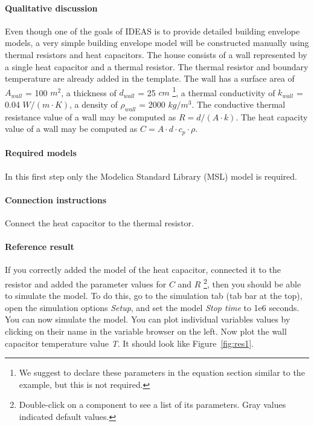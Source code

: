 \documentclass[10pt,a4paper]{article}
\begin{document}
\paragraph{Qualitative discussion}
Even though one of the goals of IDEAS is to provide
detailed building envelope models, a very simple building
envelope model will be constructed manually using thermal
resistors and heat capacitors.
The house consists of a wall represented 
by a single heat capacitor and a thermal resistor. 
The thermal resistor and boundary temperature 
are already added in the template.
The wall has a surface area of $A_{wall}$ = 100 $m^2$, 
a thickness of $d_{wall}$ = 25 $cm$
\footnote{We suggest to declare these parameters in the equation section similar to the example, but this is not required.}, 
a thermal conductivity of $k_{wall}$ = 0.04 $W/(m\cdot K)$, 
a density of $\rho_{wall}$ = 2000 $kg/m^3$.
The conductive thermal resistance value of a wall may be computed as $R=d/(A\cdot k)$.
The heat capacity value of a wall may be computed as $C=A\cdot d \cdot c_p \cdot \rho$.

\paragraph{Required models}
In this first step only the Modelica Standard Library (MSL) 
model 
is required.

\paragraph{Connection instructions}
Connect the heat capacitor to the thermal resistor.

\paragraph{Reference result}
If you correctly added the model of the heat capacitor, connected it to the resistor and 
added the parameter values for $C$ and $R$
\footnote{Double-click on a component to see a list of its parameters. Gray values indicated default values.},
then you should be able to simulate the model.
To do this, go to the simulation tab (tab bar at the top),
open the simulation options \textit{Setup},
and set the model \textit{Stop time} to 1e6 seconds.
You can now simulate the model.
You can plot individual variables values by clicking on their name in the variable browser on the left.
Now plot the wall capacitor temperature value \textit{T}. 
It should look like Figure~\ref{fig:res1}.
\end{document}
